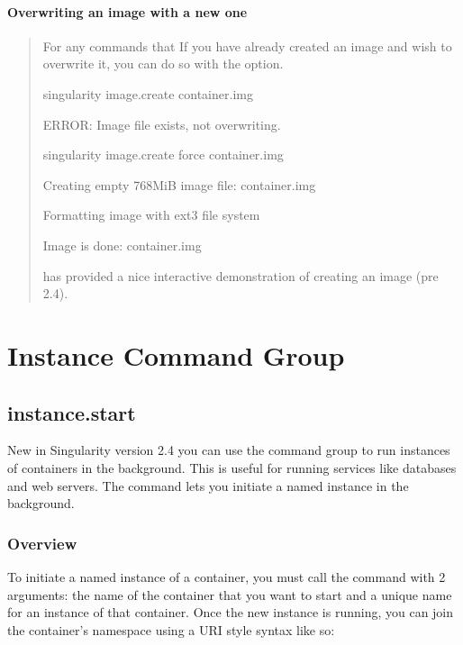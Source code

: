 \documentclass[letterpaper,10pt,english]{sphinxmanual}
\begin{document}
\paragraph{Overwriting an image with a new one}
\label{\detokenize{appendix:overwriting-an-image-with-a-new-one}}\begin{quote}

For any commands that If you have already created an image and wish to
overwrite it, you can do so with the  option.

%
\begin{sphinxVerbatim}[commandchars=\\\{\}]
\PYGZdl{} singularity image.create container.img

ERROR: Image file exists, not overwriting.



\PYGZdl{} singularity image.create \PYGZhy{}\PYGZhy{}force container.img

Creating empty 768MiB image file: container.img

Formatting image with ext3 file system

Image is done: container.img
\end{sphinxVerbatim}

 has provided a nice interactive demonstration of creating an image (pre
2.4).
\end{quote}


\section{Instance Command Group}
\label{\detokenize{appendix:instance-command-group}}

\subsection{instance.start}
\label{\detokenize{appendix:instance-start}}\label{\detokenize{appendix:sec-instances}}\label{\detokenize{appendix:sec-instancestart}}
New in Singularity version 2.4 you can use the  command group to run
instances of containers in the background. This is useful for running
services like databases and web servers. The  command lets you initiate a
named instance in the background.


\subsubsection{Overview}
\label{\detokenize{appendix:id46}}
To initiate a named instance of a container, you must call the  command
with 2 arguments: the name of the container that you want to start and a
unique name for an instance of that container. Once the new instance is
running, you can join the container’s namespace using a URI style syntax
like so:
\end{document}
